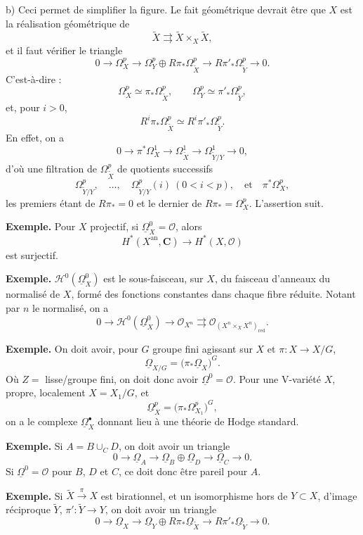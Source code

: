 \documentclass[11pt]{article}
\newcommand{\OO}{\mathcal O}
\newcommand{\CC}{\mathbf C}
\newcommand{\HH}{\mathcal H}
\newcommand{\uOmega}{\underline{\Omega}}
\newcommand{\red}{\mathrm{red}}
\begin{document}
b) Ceci permet de simplifier la figure. Le fait géométrique devrait être que \(X\) est la réalisation géométrique de
\[
\widetilde X\rightrightarrows \widetilde X\times_X\widetilde X,
\]
et il faut vérifier le triangle
\[
0\longrightarrow \Omega^p_X\longrightarrow
\Omega^p_Y\oplus R\pi_\ast\Omega^p_{\widetilde X}
\longrightarrow R\pi'_\ast\Omega^p_{\widetilde Y}\longrightarrow 0.
\]
C'est-à-dire :
\[
\Omega^p_X\simeq \pi_\ast\Omega^p_{\widetilde X},\qquad
\Omega^p_Y\simeq \pi'_\ast\Omega^p_{\widetilde Y},
\]
et, pour \(i>0\),
\[
R^i\pi_\ast\Omega^p_{\widetilde X}\simeq
R^i\pi'_\ast\Omega^p_{\widetilde Y}.
\]
En effet, on a
\[
0\longrightarrow \pi^\ast\Omega^1_X\longrightarrow
\Omega^1_{\widetilde X}\longrightarrow \Omega^1_{\widetilde Y/Y}\longrightarrow 0,
\]
d'où une filtration de \(\Omega^p_{\widetilde X}\) de quotients successifs
\[
\Omega^p_{\widetilde Y/Y},\quad \ldots,\quad
\Omega^p_{\widetilde Y/Y}(i)\ (0<i<p),\quad\text{et}\quad
\pi^\ast\Omega^p_X,
\]
les premiers étant de \(R\pi_\ast=0\) et le dernier de \(R\pi_\ast=\Omega^p_X\). L'assertion suit.

\textbf{Exemple.} Pour \(X\) projectif, si \(\uOmega^0_X=\OO\), alors
\[
H^\ast(X^{\mathrm{an}},\CC)\longrightarrow H^\ast(X,\OO)
\]
est surjectif.

\textbf{Exemple.} \(\HH^0(\uOmega^0_X)\) est le sous-faisceau, sur \(X\), du faisceau d'anneaux du normalisé de \(X\), formé des fonctions constantes dans chaque fibre réduite. Notant par \(n\) le normalisé, on a
\[
0\longrightarrow \HH^0(\uOmega^0_X)\longrightarrow
\OO_{X^n}\rightrightarrows
\OO_{(X^n\times_X X^n)_{\red}}.
\]

\textbf{Exemple.} On doit avoir, pour \(G\) groupe fini agissant sur \(X\) et \(\pi\colon X\to X/G\),
\[
\uOmega_{X/G}=\bigl(\pi_\ast\uOmega_X\bigr)^G.
\]
Où \(Z=\) lisse/groupe fini, on doit donc avoir \(\uOmega^0=\OO\). Pour une V-variété \(X\), propre, localement \(X=X_1/G\), et
\[
\uOmega^p_X=\bigl(\pi_\ast\Omega^p_{X_1}\bigr)^G,
\]
on a le complexe \(\uOmega^\bullet_X\) donnant lieu à une théorie de Hodge standard.

\textbf{Exemple.} Si \(A=B\cup_C D\), on doit avoir un triangle
\[
0\longrightarrow \uOmega_A\longrightarrow
\uOmega_B\oplus\uOmega_D\longrightarrow \uOmega_C\longrightarrow 0.
\]
Si \(\uOmega^0=\OO\) pour \(B\), \(D\) et \(C\), ce doit donc être pareil pour \(A\).

\textbf{Exemple.} Si \(\widetilde X\xrightarrow{\pi}X\) est birationnel, et un isomorphisme hors de \(Y\subset X\), d'image réciproque \(\widetilde Y\), \(\pi'\colon\widetilde Y\to Y\), on doit avoir un triangle
\[
0\longrightarrow \uOmega_X\longrightarrow
\uOmega_Y\oplus R\pi_\ast\uOmega_{\widetilde X}
\longrightarrow R\pi'_\ast\uOmega_{\widetilde Y}\longrightarrow 0.
\]
\end{document}
